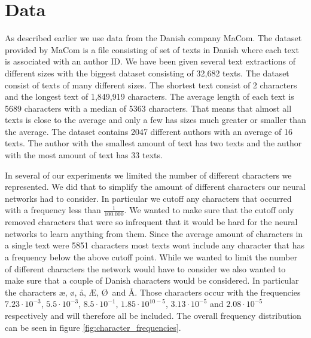 \section{Data} \label{sec:data}

As described earlier we use data from the Danish company MaCom. The dataset
provided by MaCom is a file consisting of set of texts in Danish where each text
is associated with an author ID. We have been given several text extractions
of different sizes with the biggest dataset consisting of 32,682 texts. The
dataset consist of texts of many different sizes. The shortest text consist of 2
characters and the longest text of 1,849,919 characters. The average length of
each text is 5689 characters with a median of 5363 characters. That means that
almost all texts is close to the average and only a few has sizes much greater
or smaller than the average. The dataset contains 2047 different authors with
an average of 16 texts. The author with the smallest amount of text has two
texts and the author with the most amount of text has 33 texts.

In several of our experiments we limited the number of different characters
we represented. We did that to simplify the amount of different characters
our neural networks had to consider. In particular we cutoff any characters
that occurred with a frequency less than $\frac{1}{100.000}$. We wanted to
make sure that the cutoff only removed characters that were so infrequent
that it would be hard for the neural networks to learn anything from them.
Since the average amount of characters in a single text were 5851 characters
most texts wont include any character that has a frequency below the above
cutoff point. While we wanted to limit the number of different characters
the network would have to consider we also wanted to make sure that a couple
of Danish characters would be considered. In particular the characters \ae,
\o, \aa, \AE, \O\ and \AA. Those characters occur with the frequencies
$7.23\cdot10^{-3}$, $5.5\cdot10^{-3}$, $8.5\cdot10^{-1}$, $1.85\cdot10^{10-5}$,
$3.13\cdot10^{-5}$ and $2.08\cdot10^{-5}$ respectively and will therefore
all be included. The overall frequency distribution can be seen in figure
\ref{fig:character_frequencies}.

